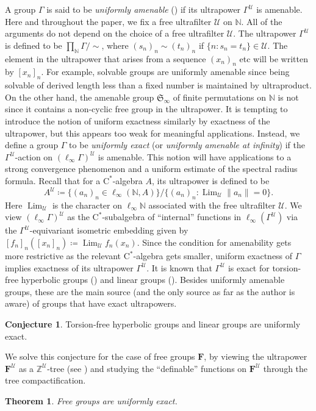 \documentclass[12pt,nosumlimits,nonamelimits]{amsart}
\newtheorem{thmA}{Theorem}
\theoremstyle{remark}
\theoremstyle{definition}
\newtheorem*{conj}{Conjecture}
\newcommand{\IN}{\mathbb{N}}
\newcommand{\IZ}{\mathbb{Z}}
\newcommand{\bF}{\mathbf{F}}
\newcommand{\fS}{\mathfrak{S}}
\newcommand{\rC}{\mathrm{C}}
\newcommand{\cU}{\mathcal{U}}
\newcommand{\Ga}{\Gamma}
\newcommand{\acts}{\curvearrowright}
\DeclareMathOperator{\Lim}{Lim}
\newcommand{\cst}{$\rC^*$-alge\-bra}
\begin{document}
A group $\Ga$ is said to be \emph{uniformly amenable} 
(\cite{bozejko, keller, ks, wysoczanski}) if 
its ultrapower $\Ga^\cU$ is amenable. 
Here and throughout the paper, we fix 
a free ultrafilter $\cU$ on $\IN$. 
All of the arguments do not depend on the choice of a free ultrafilter $\cU$.
The ultrapower $\Ga^\cU$ is defined to be $\prod_{\IN}\Ga/{\sim}$, 
where $(s_n)_n\sim(t_n)_n$ if $\{ n : s_n=t_n \} \in \cU$. 
The element in the ultrapower that arises from 
a sequence $(x_n)_n$ etc will be written by $[x_n]_n$.
For example, solvable groups are uniformly amenable 
since being solvable of derived length less than a fixed number is 
maintained by ultraproduct. On the other hand, 
the amenable group $\fS_\infty$ of finite permutations 
on $\IN$ is not since it contains a non-cyclic free group 
in the ultrapower.
It is tempting to introduce the notion of uniform exactness 
similarly by exactness of the ultrapower, 
but this appears too weak for meaningful applications. 
Instead, we define a group $\Ga$ to be \emph{uniformly exact} 
(or \emph{uniformly amenable at infinity}) if 
the $\Ga^\cU$-action on $(\ell_\infty\Ga)^\cU$ 
is amenable.
This notion will have applications 
to a strong convergence phenomenon 
and a uniform estimate of the spectral radius formula.  
Recall that for a \cst{} $A$, its ultrapower is defined to be 
\[
A^\cU \coloneq \{ (a_n)_n \in\ell_\infty(\IN,A) \}/\{ (a_n)_n : \Lim_\cU \|a_n\|=0\}.
\]
Here $\Lim_{\cU}$ is the character on $\ell_\infty\IN$ associated 
with the free ultrafilter $\cU$. 
We view $(\ell_\infty\Ga)^\cU$ 
as the $\mathrm{C}^*$-sub\-alge\-bra of ``internal'' functions 
in $\ell_\infty(\Ga^\cU)$ 
via the $\Ga^\cU$-equivariant isometric embedding given by 
$[f_n]_n([x_n]_n) \coloneq \Lim_\cU f_n(x_n)$. 
Since the condition for amenability gets more restrictive  
as the relevant \cst{} gets smaller, 
uniform exactness of $\Ga$ implies exactness of its 
ultrapower $\Ga^\cU$. 
It is known that $\Ga^\cU$ is exact 
for torsion-free hyperbolic groups (\cite{km2,sela:plms})
and linear groups (\cite{ghw}). 
Besides uniformly amenable groups, these 
are the main source (and the only source as far as 
the author is aware) of groups that have exact ultrapowers.
%
\begin{conj}
Torsion-free hyperbolic groups and linear groups are uniformly exact. 
\end{conj}
%
We solve this conjecture for the case of free groups $\bF$, 
by viewing the ultrapower $\bF^\cU$ as a $\IZ^\cU$-tree 
(see \cite{chiswell}) and studying the ``definable'' functions 
on $\bF^\cU$ through the tree compactification. 
%
\begin{thmA}\label{thmA:freegroup}
Free groups are uniformly exact. 
\end{thmA}
\end{document}
